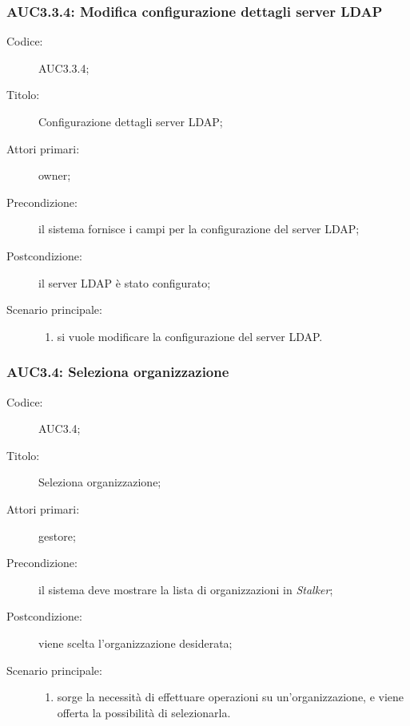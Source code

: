 \documentclass[../../../analisi-dei-requisiti.tex]{subfiles}
\begin{document}
\subsubsection{AUC3.3.4: Modifica configurazione dettagli server LDAP}%
\label{subs:AUC3.3.4}
\begin{description}
  \item[Codice:] AUC3.3.4;
  \item[Titolo:] Configurazione dettagli server LDAP;
  \item[Attori primari:] owner;
  \item[Precondizione:] il sistema fornisce i campi per la configurazione del server LDAP;
  \item[Postcondizione:] il server LDAP è stato configurato;
  \item[Scenario principale:]
        \begin{enumerate}
          \item si vuole modificare la configurazione del server LDAP.
        \end{enumerate}
\end{description}

\subsubsection{AUC3.4: Seleziona organizzazione}%
\label{subs:AUC3.4}
\begin{description}
  \item[Codice:] AUC3.4;
  \item[Titolo:] Seleziona organizzazione;
  \item[Attori primari:] gestore;
  \item[Precondizione:] il sistema deve mostrare la lista di organizzazioni in \emph{Stalker};
  \item[Postcondizione:] viene scelta l'organizzazione desiderata;
  \item[Scenario principale:]
        \begin{enumerate}
          \item sorge la necessità di effettuare operazioni su un'organizzazione, e viene offerta la possibilità di selezionarla.
        \end{enumerate}
\end{description}
\end{document}
